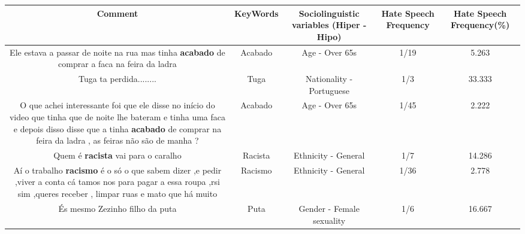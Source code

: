 \documentclass[11pt]{article}
\newlength\mylength
\begin{document}
\begin{center}
\setlength\mylength{\dimexpr\textwidth - 1\arrayrulewidth - 50\tabcolsep}
\begin{longtable}{|C{.65\mylength}|C{.30\mylength}|C{.12\mylength}|C{.12\mylength}|C{.12\mylength}|}
\hline
\textbf{Comment} & \textbf{KeyWords} & \textbf{Sociolinguistic variables (Hiper - Hipo)}  & \textbf{Hate Speech Frequency} & \textbf{Hate Speech Frequency(\%)} \\
\hline{}\small Ele estava a passar de noite na rua mas tinha \textbf{acabado} de comprar a faca na feira da ladra\normalsize   & Acabado & Age - Over 65s & 1/19 & 5.263 \\  \hline
  \small Tuga ta perdida........\normalsize   & Tuga & Nationality - Portuguese & 1/3 & 33.333 \\  \hline
  \small O que achei interessante foi que ele disse no início do video que tinha que de noite lhe bateram e tinha uma faca e depois disso disse que a tinha \textbf{acabado} de comprar na feira da ladra , as feiras não são de manha ?\normalsize   & Acabado & Age - Over 65s & 1/45 & 2.222 \\  \hline
  \small Quem é \textbf{racista} vai para o caralho\normalsize   & Racista & Ethnicity - General & 1/7 & 14.286 \\  \hline
  \small Aí o trabalho \textbf{racismo} é o só o que sabem dizer ,e pedir ,viver a conta cá tamos nos para pagar a essa roupa ,rsi sim ,queres receber , limpar ruas e mato que há muito\normalsize   & Racismo & Ethnicity - General & 1/36 & 2.778 \\  \hline
  \small És mesmo Zezinho filho da puta\normalsize   & Puta & Gender - Female sexuality & 1/6 & 16.667 \\  \hline

\end{longtable}
\end{center}
\end{document}
